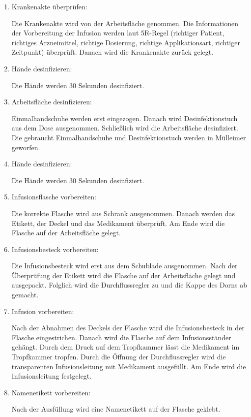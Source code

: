   \begin{enumerate}[start=0]
      \item Krankenakte überprüfen:
      
      Die Krankenakte wird von der Arbeitsfläche genommen. Die Informationen der Vorbereitung der Infusion werden laut 5R-Regel (richtiger Patient, richtiges Arzneimittel, richtige Dosierung, richtige Applikationsart, richtiger Zeitpunkt) überprüft. Danach wird die Krankenakte zurück gelegt.
      
      \item Hände desinfizieren:
      
      Die Hände werden 30 Sekunden desinfiziert.
      
      \item Arbeitsfläche desinfizieren:
      
      Einmalhandschuhe werden erst eingezogen. Danach wird Desinfektionstuch aus dem Dose ausgenommen. Schließlich wird die Arbeitsfläche desinfiziert. Die gebraucht Einmalhandschuhe und Desinfektionstuch werden in Mülleimer geworfen.
      \item Hände desinfizieren:
      
      Die Hände werden 30 Sekunden desinfiziert.
      
      \item Infusionsflasche vorbereiten:
      
      Die korrekte Flasche wird aus Schrank ausgenommen. Danach werden das Etikett, der Deckel und das Medikament überprüft. Am Ende wird die Flasche auf der Arbeitsfläche gelegt.
      
      \item Infusionsbesteck vorbereiten:
      
      Die Infusionsbesteck wird erst aus dem Schublade ausgenommen. Nach der Überprüfung der Etikett wird die Flasche auf der Arbeitsfläche gelegt und ausgepackt. Folglich wird die Durchflussregler zu und die Kappe des Dorns ab gemacht.
      
      \item Infusion vorbereiten:
      
      Nach der Abnahmen des Deckels der Flasche wird die Infusionsbesteck in der Flasche eingestrichen. Danach wird die Flasche auf dem Infusionsständer gehängt. Durch dem Druck auf dem Tropfkammer lässt die Medikament im Tropfkammer tropfen. Durch die Öffnung der Durchflussregler wird die transparenten Infusionsleitung mit Medikament ausgefüllt. Am Ende wird die Infusionsleitung festgelegt.
      
      \item Namenetikett vorbereiten:
      
      Nach der Ausfüllung wird eine Namenetikett auf der Flasche geklebt.
      
  \end{enumerate}  
      
